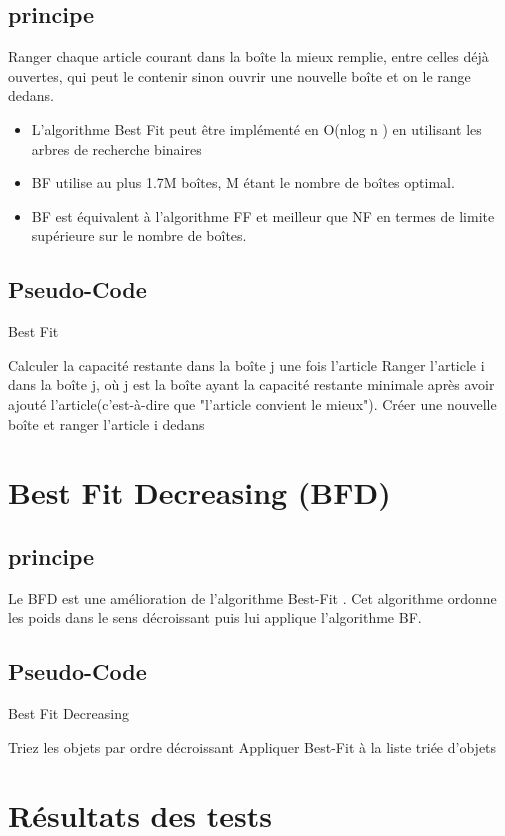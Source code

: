 \documentclass[class=article, crop=false]{standalone}
\begin{document}
\subsection{principe}
Ranger chaque article courant dans la boîte la mieux remplie, entre celles déjà ouvertes, qui peut le contenir sinon ouvrir une nouvelle boîte et on le range dedans.
\begin{itemize}
    \item L’algorithme Best Fit peut être implémenté en O(nlog n ) en utilisant les arbres de recherche binaires
    \item BF utilise au plus 1.7M boîtes, M étant le nombre de boîtes optimal. 
    \item BF est équivalent à l’algorithme FF et meilleur que NF en termes de limite supérieure sur le nombre de boîtes.
\end{itemize}

\subsection{Pseudo-Code}
\begin{algorithm}[H]
    \caption{Best Fit}
    \begin{algorithmic}
              \STATE Calculer la capacité restante dans la boîte j une fois l'article
             \ENDIF 
        \ENDFOR
        \STATE Ranger l’article i dans la boîte j, où j est la boîte ayant la capacité restante minimale après avoir ajouté l’article(c'est-à-dire que "l’article convient le mieux").
            \STATE Créer une nouvelle boîte et ranger l’article i dedans
        \ENDIF
    \ENDFOR
    \end{algorithmic}
\end{algorithm}

\section{Best Fit Decreasing (BFD)}
\subsection{principe}
Le BFD est une amélioration de l’algorithme Best-Fit . Cet algorithme ordonne les poids dans le sens décroissant puis lui applique l’algorithme BF.

\subsection{Pseudo-Code}

\begin{algorithm}
    \caption{Best Fit Decreasing }
    \begin{algorithmic}
        \STATE Triez les objets par ordre décroissant
        \STATE Appliquer Best-Fit à la liste triée d'objets
    \end{algorithmic}
\end{algorithm}

\section{Résultats des tests}
\end{document}
